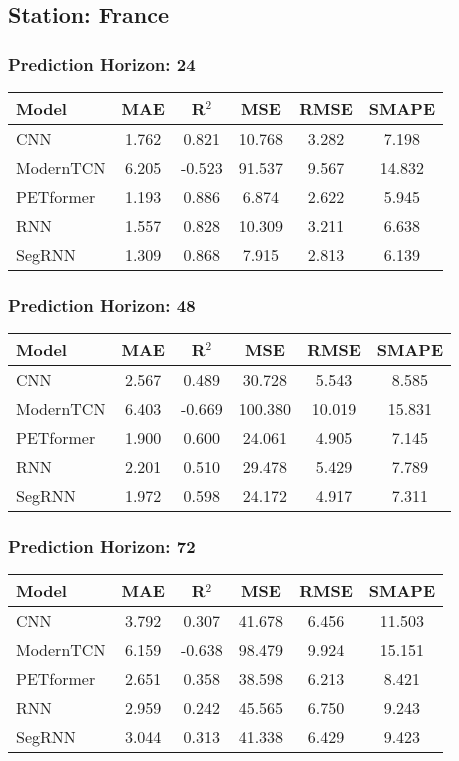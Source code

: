 \subsection*{Station: France}
\subsubsection*{Prediction Horizon: 24}
\begin{tabular}{lccccc}
\toprule
Model & MAE & R$^2$ & MSE & RMSE & SMAPE \\
\midrule
CNN & 1.762 & 0.821 & 10.768 & 3.282 & 7.198 \\
ModernTCN & 6.205 & -0.523 & 91.537 & 9.567 & 14.832 \\
PETformer & 1.193 & 0.886 & 6.874 & 2.622 & 5.945 \\
RNN & 1.557 & 0.828 & 10.309 & 3.211 & 6.638 \\
SegRNN & 1.309 & 0.868 & 7.915 & 2.813 & 6.139 \\
\bottomrule
\end{tabular}
\vspace{0.5cm}
\subsubsection*{Prediction Horizon: 48}
\begin{tabular}{lccccc}
\toprule
Model & MAE & R$^2$ & MSE & RMSE & SMAPE \\
\midrule
CNN & 2.567 & 0.489 & 30.728 & 5.543 & 8.585 \\
ModernTCN & 6.403 & -0.669 & 100.380 & 10.019 & 15.831 \\
PETformer & 1.900 & 0.600 & 24.061 & 4.905 & 7.145 \\
RNN & 2.201 & 0.510 & 29.478 & 5.429 & 7.789 \\
SegRNN & 1.972 & 0.598 & 24.172 & 4.917 & 7.311 \\
\bottomrule
\end{tabular}
\vspace{0.5cm}
\subsubsection*{Prediction Horizon: 72}
\begin{tabular}{lccccc}
\toprule
Model & MAE & R$^2$ & MSE & RMSE & SMAPE \\
\midrule
CNN & 3.792 & 0.307 & 41.678 & 6.456 & 11.503 \\
ModernTCN & 6.159 & -0.638 & 98.479 & 9.924 & 15.151 \\
PETformer & 2.651 & 0.358 & 38.598 & 6.213 & 8.421 \\
RNN & 2.959 & 0.242 & 45.565 & 6.750 & 9.243 \\
SegRNN & 3.044 & 0.313 & 41.338 & 6.429 & 9.423 \\
\bottomrule
\end{tabular}
\vspace{0.5cm}
